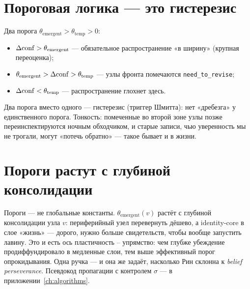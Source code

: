 \section{Пороговая логика --- это гистерезис}

Два порога $\theta_{\text{emergent}} > \theta_{\text{temp}} > 0$:
\begin{itemize}
\item $\Delta\mathrm{conf} > \theta_{\text{emergent}}$ --- обязательное распространение
«в ширину» (крупная переоценка);
\item $\theta_{\text{emergent}} > \Delta\mathrm{conf} > \theta_{\text{temp}}$ ---
узлы фронта помечаются \texttt{need\_to\_revise};
\item $\Delta\mathrm{conf} < \theta_{\text{temp}}$ --- распространение глохнет здесь.
\end{itemize}
Два порога вместо одного --- гистерезис (триггер Шмитта): нет «дребезга» у
единственного порога. Тонкость: помеченные во второй зоне узлы позже
переинспектируются ночным обходчиком, и старые записи, чью уверенность мы не
трогали, могут «потечь обратно» --- такое бывает и в жизни.

\section{Пороги растут с глубиной консолидации}

Пороги --- не глобальные константы.
$\theta_{\text{emergent}}(v)$ растёт с глубиной консолидации узла $v$:
периферийный узел перевернуть дёшево, а identity-core в слое «жизнь» ---
дорого, нужно больше свидетельств, чтобы вообще запустить лавину. Это и есть
ось пластичность -- упрямство: чем глубже убеждение продиффундировало в
медленные слои, тем выше эффективный порог опрокидывания. Одна ручка --- и
она же задаёт, насколько Рин склонна к \textit{belief perseverance}. Псевдокод
пропагации с контролем $\sigma$ --- в приложении~\ref{ch:algorithms}.
